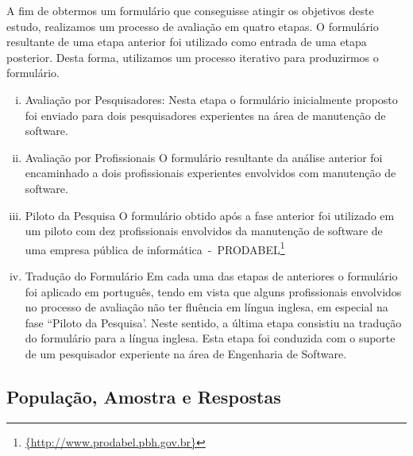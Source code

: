 A fim de obtermos um formulário que conseguisse atingir os objetivos deste
estudo, realizamos um processo de avaliação em quatro etapas. O formulário
resultante de uma etapa anterior foi utilizado como entrada de uma etapa
posterior. Desta forma, utilizamos um processo iterativo para produzirmos o
formulário.
\begin{enumerate}[(i)]
	\item Avaliação por Pesquisadores: Nesta etapa o formulário inicialmente
		proposto foi enviado para dois pesquisadores experientes na área de
		manutenção de software.
	\item Avaliação por Profissionais O formulário resultante da análise
		anterior foi encaminhado a dois profissionais experientes envolvidos com
		manutenção de software. 
	\item Piloto da Pesquisa O formulário obtido após a fase anterior foi
		utilizado em um piloto com
		dez profissionais envolvidos da manutenção de software de uma empresa
		pública de
		informática~-~PRODABEL\footnote{\url{{http://www.prodabel.pbh.gov.br}}}
	\item Tradução do Formulário Em cada uma das etapas de anteriores o
		formulário foi aplicado em
		português, tendo em vista que alguns profissionais envolvidos no
		processo de avaliação não
		ter fluência em língua inglesa, em especial na fase ``Piloto da
		Pesquisa'. Neste sentido, a última etapa  consistiu na tradução do
		formulário para a língua inglesa.  Esta etapa foi conduzida com  o
		suporte de um pesquisador experiente na área de Engenharia de Software.	
\end{enumerate}

\subsection{População, Amostra e Respostas}
\label{subsec:populacao_amostra_respostas}

